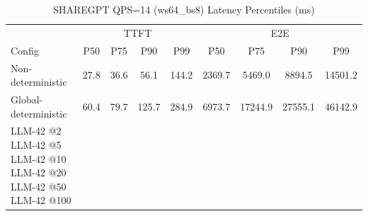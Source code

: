 \begin{table}[htbp]
\centering
\caption{SHAREGPT QPS=14 (ws64_bs8) Latency Percentiles (ms)}
\label{tab:sharegpt_qps14_ws64_bs8}
\begin{tabular}{l|cccc|cccc}
\toprule
& \multicolumn{4}{c|}{TTFT} & \multicolumn{4}{c}{E2E} \\
Config & P50 & P75 & P90 & P99 & P50 & P75 & P90 & P99 \\
\midrule
Non-deterministic & 27.8 & 36.6 & 56.1 & 144.2 & 2369.7 & 5469.0 & 8894.5 & 14501.2 \\
Global-deterministic & 60.4 & 79.7 & 125.7 & 284.9 & 6973.7 & 17244.9 & 27555.1 & 46142.9 \\
LLM-42 @2%
LLM-42 @5%
LLM-42 @10%
LLM-42 @20%
LLM-42 @50%
LLM-42 @100%
\bottomrule
\end{tabular}
\end{table}
